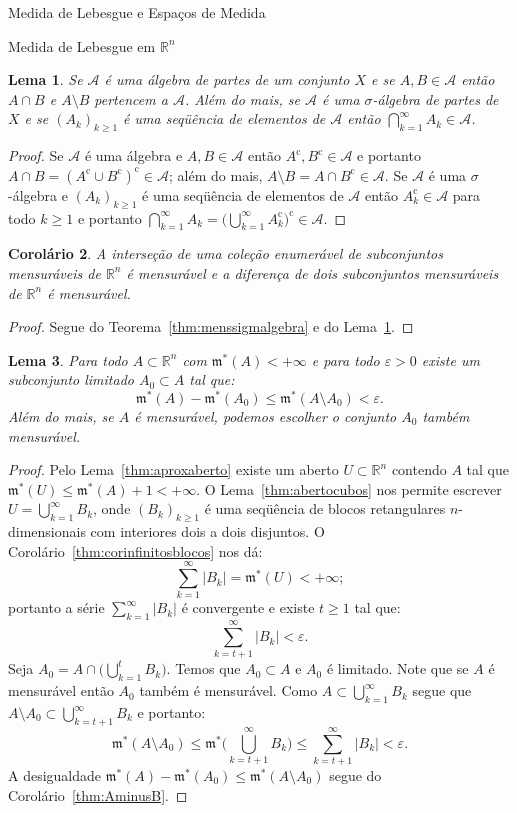 \documentclass[oneside,final,11pt]{amsbook}
\newcommand{\R}{\mathds R}
\newcommand{\leb}{\mathfrak m}
\newcommand{\compl}{\mathrm c}
\theoremstyle{remark}\newtheorem{exercise}{Exercício}[chapter]
\theoremstyle{remark}\newtheorem{*exercise}[exercise]{\hbox to 0pt{\hskip 0pt minus 1fil*}Exercício}
\theoremstyle{definition}\newtheorem{exdefin}{Definição}[chapter]
\theoremstyle{plain}\newtheorem{teo}{Teorema}[section]
\theoremstyle{plain}\newtheorem{lem}[teo]{Lema}
\theoremstyle{plain}\newtheorem{prop}[teo]{Proposição}
\theoremstyle{plain}\newtheorem{cor}[teo]{Corolário}
\theoremstyle{definition}\newtheorem{defin}[teo]{Definição}
\theoremstyle{remark}\newtheorem{rem}[teo]{Observação}
\theoremstyle{definition}\newtheorem{notation}[teo]{Notação}
\theoremstyle{definition}\newtheorem{convention}[teo]{Convenção}
\theoremstyle{definition}\newtheorem{example}[teo]{Exemplo}
\numberwithin{section}{chapter}
\numberwithin{equation}{section}
\begin{document}
\begin{chapter}{Medida de Lebesgue e Espaços de Medida}
\begin{section}[Medida de Lebesgue em $\R^n$]{Medida de Lebesgue em ${\R^n}$}
\begin{lem}\label{thm:propalgebras}
Se $\mathcal A$ é uma álgebra de partes de um conjunto $X$ e se $A,B\in\mathcal A$ então
$A\cap B$ e $A\setminus B$ pertencem a $\mathcal A$. Além do mais, se $\mathcal A$ é uma
$\sigma$-álgebra de partes de $X$ e se $(A_k)_{k\ge1}$ é uma seqüência de elementos de $\mathcal A$
então $\bigcap_{k=1}^\infty A_k\in\mathcal A$.
\end{lem}
\begin{proof}
Se $\mathcal A$ é uma álgebra e $A,B\in\mathcal A$ então $A^\compl,B^\compl\in\mathcal A$
e portanto $A\cap B=(A^\compl\cup B^\compl)^\compl\in\mathcal A$; além do mais,
$A\setminus B=A\cap B^\compl\in\mathcal A$. Se $\mathcal A$ é uma $\sigma$-álgebra
e $(A_k)_{k\ge1}$ é uma seqüência de elementos de $\mathcal A$ então $A_k^\compl\in\mathcal A$
para todo $k\ge1$ e portanto $\bigcap_{k=1}^\infty A_k=\big(\bigcup_{k=1}^\infty A_k^\compl\big)^\compl\in\mathcal A$.
\end{proof}

\begin{cor}\label{thm:interdifmens}
A interseção de uma coleção enumerável de subconjuntos mensuráveis de $\R^n$ é mensurável e a
diferença de dois subconjuntos mensuráveis de $\R^n$ é mensurável.
\end{cor}
\begin{proof}
Segue do Teorema~\ref{thm:menssigmalgebra} e do Lema~\ref{thm:propalgebras}.
\end{proof}

\begin{lem}\label{thm:A0limitado}
Para todo $A\subset\R^n$ com $\leb^*(A)<+\infty$ e para todo $\varepsilon>0$
existe um subconjunto limitado $A_0\subset A$ tal que:
\[\leb^*(A)-\leb^*(A_0)\le\leb^*(A\setminus A_0)<\varepsilon.\]
Além do mais, se $A$ é mensurável, podemos escolher o conjunto $A_0$ também mensurável.
\end{lem}
\begin{proof}
Pelo Lema~\ref{thm:aproxaberto} existe um aberto $U\subset\R^n$ contendo $A$ tal que
$\leb^*(U)\le\leb^*(A)+1<+\infty$. O Lema~\ref{thm:abertocubos} nos permite escrever
$U=\bigcup_{k=1}^\infty B_k$, onde $(B_k)_{k\ge1}$ é uma seqüência de blocos retangulares
$n$-dimensionais com interiores dois a dois disjuntos. O Corolário~\ref{thm:corinfinitosblocos} nos dá:
\[\sum_{k=1}^\infty\vert B_k\vert=\leb^*(U)<+\infty;\]
portanto a série $\sum_{k=1}^\infty\vert B_k\vert$ é convergente e
existe $t\ge1$ tal que:
\[\sum_{k=t+1}^\infty\vert B_k\vert<\varepsilon.\]
Seja $A_0=A\cap\big(\bigcup_{k=1}^tB_k\big)$. Temos que $A_0\subset A$ e $A_0$ é limitado. Note
que se $A$ é mensurável então $A_0$ também é mensurável. Como
$A\subset\bigcup_{k=1}^\infty B_k$ segue que $A\setminus A_0\subset\bigcup_{k=t+1}^\infty B_k$
e portanto:
\[\leb^*(A\setminus A_0)\le\leb^*\Big(\bigcup_{k=t+1}^\infty B_k\Big)
\le\sum_{k=t+1}^\infty\vert B_k\vert<\varepsilon.\]
A desigualdade $\leb^*(A)-\leb^*(A_0)\le\leb^*(A\setminus A_0)$ segue do Corolário~\ref{thm:AminusB}.
\end{proof}


\end{section}
\end{chapter}
\end{document}
